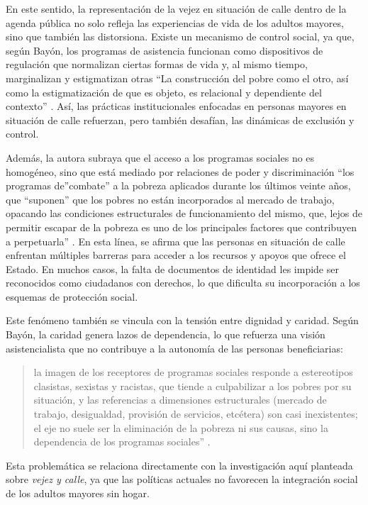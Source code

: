 \documentclass[
  spanish,
  11pt,
  a4paper,
]{scrbook}
\begin{document}
En este sentido, la representación de la vejez en situación de calle
dentro de la agenda pública no solo refleja las experiencias de vida de
los adultos mayores, sino que también las distorsiona. Existe un
mecanismo de control social, ya que, según Bayón, los programas de
asistencia funcionan como dispositivos de regulación que normalizan
ciertas formas de vida y, al mismo tiempo, marginalizan y estigmatizan
otras ``La construcción del pobre como el otro, así como la
estigmatización de que es objeto, es relacional y dependiente del
contexto'' \autocite[362]{Bayon2014}. Así, las prácticas institucionales
enfocadas en personas mayores en situación de calle refuerzan, pero
también desafían, las dinámicas de exclusión y control.

Además, la autora subraya que el acceso a los programas sociales no es
homogéneo, sino que está mediado por relaciones de poder y
discriminación ``los programas de''combate'' a la pobreza aplicados
durante los últimos veinte años, que ``suponen'' que los pobres no están
incorporados al mercado de trabajo, opacando las condiciones
estructurales de funcionamiento del mismo, que, lejos de permitir
escapar de la pobreza es uno de los principales factores que contribuyen
a perpetuarla'' \autocite[367]{Bayon2014}. En esta línea, se afirma que
las personas en situación de calle enfrentan múltiples barreras para
acceder a los recursos y apoyos que ofrece el Estado. En muchos casos,
la falta de documentos de identidad les impide ser reconocidos como
ciudadanos con derechos, lo que dificulta su incorporación a los
esquemas de protección social.

Este fenómeno también se vincula con la tensión entre dignidad y
caridad. Según Bayón, la caridad genera lazos de dependencia, lo que
refuerza una visión asistencialista que no contribuye a la autonomía de
las personas beneficiarias:

\begin{quote}
la imagen de los receptores de programas sociales responde a
estereotipos clasistas, sexistas y racistas, que tiende a culpabilizar a
los pobres por su situación, y las referencias a dimensiones
estructurales (mercado de trabajo, desigualdad, provisión de servicios,
etcétera) son casi inexistentes; el eje no suele ser la eliminación de
la pobreza ni sus causas, sino la dependencia de los programas
sociales'' \autocite[368]{Bayon2014}.
\end{quote}

Esta problemática se relaciona directamente con la investigación aquí
planteada sobre \emph{vejez y calle}, ya que las políticas actuales no
favorecen la integración social de los adultos mayores sin hogar.
\end{document}
